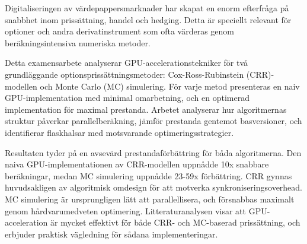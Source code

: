 \documentclass[english,12pt,a4paper,pdftex,sci,utf8]{aaltothesis}
\begin{document}
\newpage
%
%
\begin{abstractpage}[swedish]
Digitaliseringen av värdepappersmarknader har skapat en enorm efterfråga på snabbhet inom prissättning, handel och hedging. Detta är speciellt relevant för optioner och andra derivatinstrument som ofta värderas genom beräkningsintensiva numeriska metoder.

Detta examensarbete analyserar GPU-accelerationstekniker för två grundläggande optionsprissättningsmetoder: Cox-Ross-Rubinstein (CRR)-modellen och Monte Carlo (MC) simulering. För varje metod presenteras en naiv GPU-implementation med minimal omarbetning, och en optimerad implementation för maximal prestanda. Arbetet analyserar hur algoritmernas struktur påverkar parallelberäkning, jämför prestanda gentemot basversioner, och identifierar flaskhalsar med motsvarande optimeringsstrategier.

Resultaten tyder på en avsevärd prestandaförbättring för båda algoritmerna. Den naiva GPU-implementationen av CRR-modellen uppnådde 10x snabbare beräkningar, medan MC simulering uppnådde 23-59x förbättring. CRR gynnas huvudsakligen av algoritmisk omdesign för att motverka synkroniseringsoverhead. MC simulering är ursprungligen lätt att parallellisera, och försnabbas maximalt genom hårdvarumedveten optimering. Litteraturanalysen visar att GPU-acceleration är mycket effektivt för både CRR- och MC-baserad prissättning, och erbjuder praktisk vägledning för sådana implementeringar.
\end{abstractpage}

\newpage



\thesistableofcontents

\cleardoublepage
\storeinipagenumber
{}
\setcounter{page}{1}
\end{document}
